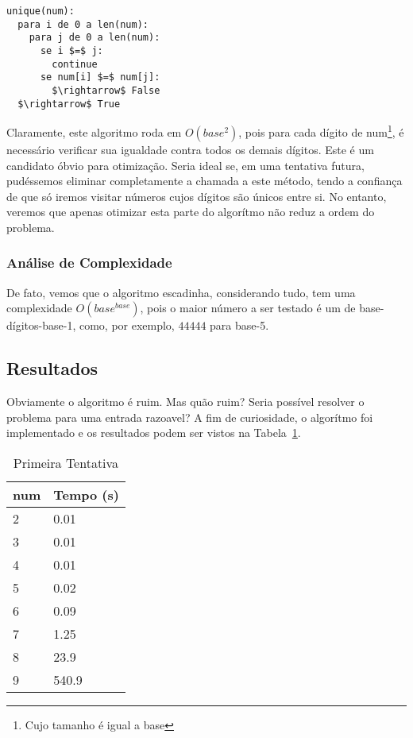 \documentclass[12pt]{article}
\begin{document}
\begin{lstlisting}
unique(num):
  para i de 0 a len(num):
    para j de 0 a len(num):
      se i $=$ j:
        continue 
      se num[i] $=$ num[j]:
        $\rightarrow$ False 
  $\rightarrow$ True 
\end{lstlisting}


Claramente, este algoritmo roda em $O(base^{2})$, pois para
cada dígito de {\sf num}\footnote{Cujo tamanho é igual a {\sf base}}, é necessário verificar sua igualdade contra todos
os demais dígitos. Este é um candidato óbvio para otimização. Seria
ideal se, em uma tentativa futura, pudéssemos eliminar completamente
a chamada a este método, tendo a confiança de que só iremos visitar
números cujos dígitos são únicos entre si. No entanto, veremos que apenas otimizar esta parte do algorítmo não reduz a ordem do problema.

\subsubsection{Análise de Complexidade}\label{section:primeira:complexidade}
De fato, vemos que o algoritmo escadinha, considerando tudo, tem uma
complexidade $O(base^{base})$, pois o maior número a ser testado é um de {\sf base}-dígitos-{\sf base-1}, como, por exemplo, $44444$ para base-5.

\subsection{Resultados}\label{section:primeira:resultados}
Obviamente o algoritmo é ruim. Mas quão ruim? Seria possível resolver o problema para uma entrada razoavel? A fim de curiosidade, o algorítmo foi implementado e os resultados podem ser vistos na Tabela~\ref{table:resultados-1}.

\begin{table}[h]
\caption{Primeira Tentativa}
\label{table:resultados-1}
\begin{tabular}{ll}
  {\sf num} & Tempo (s) \\
  \hline
  2 & 0.01 \\
  3 & 0.01 \\
  4 & 0.01 \\
  5 & 0.02 \\
  6 & 0.09 \\
  7 & 1.25 \\
  8 & 23.9 \\
  9 & 540.9    
\end{tabular}
\end{table}
\end{document}
